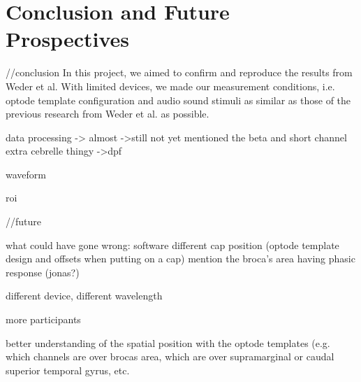 \chapter{Conclusion and Future Prospectives}
//conclusion
In this project, we aimed to confirm and reproduce the results from Weder et al. With limited devices, we made our measurement conditions, i.e. optode template configuration and audio sound stimuli as similar as those of the previous research from Weder et al. as possible.

data processing
-> almost
->still not yet mentioned the beta and short channel extra cebrelle thingy
->dpf

waveform 

roi

//future

what could have gone wrong:
software different
cap position (optode template design and offsets when putting on a cap) mention the broca's area having phasic response (jonas?)

different device, different wavelength

more participants

better understanding of the spatial position with the optode templates (e.g. which channels are over brocas area, which are over supramarginal or caudal superior temporal gyrus, etc.